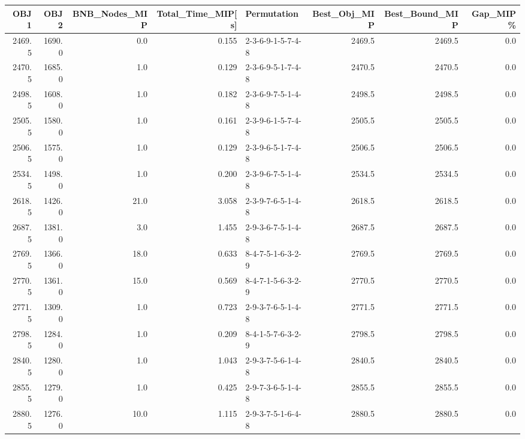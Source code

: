 \begin{tabular}{rrrrlrrr}
\toprule
   OBJ1 &    OBJ2 &  BNB\_Nodes\_MIP &  Total\_Time\_MIP[s] &        Permutation &  Best\_Obj\_MIP &  Best\_Bound\_MIP &  Gap\_MIP\% \\
\midrule
 2469.5 &  1690.0 &            0.0 &              0.155 &  2-3-6-9-1-5-7-4-8 &        2469.5 &          2469.5 &       0.0 \\
 2470.5 &  1685.0 &            1.0 &              0.129 &  2-3-6-9-5-1-7-4-8 &        2470.5 &          2470.5 &       0.0 \\
 2498.5 &  1608.0 &            1.0 &              0.182 &  2-3-6-9-7-5-1-4-8 &        2498.5 &          2498.5 &       0.0 \\
 2505.5 &  1580.0 &            1.0 &              0.161 &  2-3-9-6-1-5-7-4-8 &        2505.5 &          2505.5 &       0.0 \\
 2506.5 &  1575.0 &            1.0 &              0.129 &  2-3-9-6-5-1-7-4-8 &        2506.5 &          2506.5 &       0.0 \\
 2534.5 &  1498.0 &            1.0 &              0.200 &  2-3-9-6-7-5-1-4-8 &        2534.5 &          2534.5 &       0.0 \\
 2618.5 &  1426.0 &           21.0 &              3.058 &  2-3-9-7-6-5-1-4-8 &        2618.5 &          2618.5 &       0.0 \\
 2687.5 &  1381.0 &            3.0 &              1.455 &  2-9-3-6-7-5-1-4-8 &        2687.5 &          2687.5 &       0.0 \\
 2769.5 &  1366.0 &           18.0 &              0.633 &  8-4-7-5-1-6-3-2-9 &        2769.5 &          2769.5 &       0.0 \\
 2770.5 &  1361.0 &           15.0 &              0.569 &  8-4-7-1-5-6-3-2-9 &        2770.5 &          2770.5 &       0.0 \\
 2771.5 &  1309.0 &            1.0 &              0.723 &  2-9-3-7-6-5-1-4-8 &        2771.5 &          2771.5 &       0.0 \\
 2798.5 &  1284.0 &            1.0 &              0.209 &  8-4-1-5-7-6-3-2-9 &        2798.5 &          2798.5 &       0.0 \\
 2840.5 &  1280.0 &            1.0 &              1.043 &  2-9-3-7-5-6-1-4-8 &        2840.5 &          2840.5 &       0.0 \\
 2855.5 &  1279.0 &            1.0 &              0.425 &  2-9-7-3-6-5-1-4-8 &        2855.5 &          2855.5 &       0.0 \\
 2880.5 &  1276.0 &           10.0 &              1.115 &  2-9-3-7-5-1-6-4-8 &        2880.5 &          2880.5 &       0.0 \\

\end{tabular}
